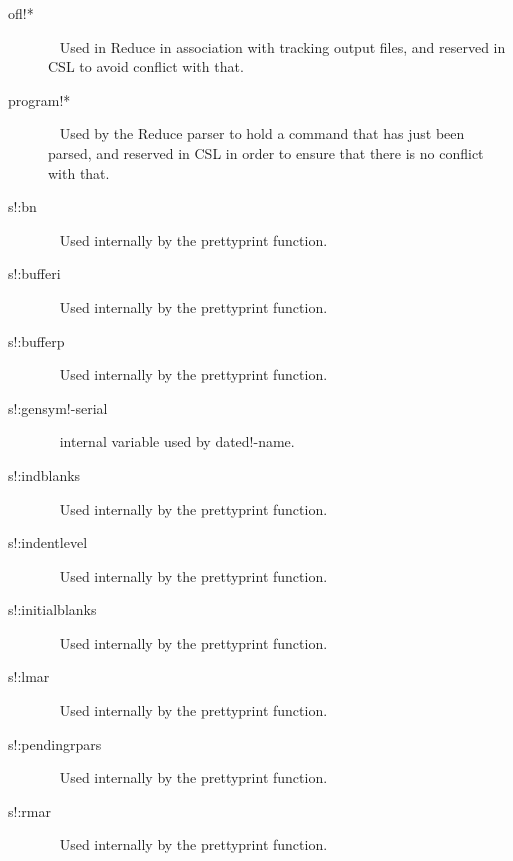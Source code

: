 \documentclass[a4paper,11pt]{article}
\begin{document}
\begin{description}
\item [{\ttfamily ofl!*}]  ~\newline
Used in Reduce in association with tracking output files, and reserved in
CSL to avoid conflict with that.

\item [{\ttfamily program!*}]  ~\newline
Used by the Reduce parser to hold a command that has just been parsed, and
reserved in CSL in order to ensure that there is no conflict with that.

\item [{\ttfamily s!:bn}]  ~\newline
Used internally by the prettyprint function.

\item [{\ttfamily s!:bufferi}] ~\newline
Used internally by the prettyprint function.

\item [{\ttfamily s!:bufferp}] ~\newline
Used internally by the prettyprint function.

\item [{\ttfamily s!:gensym!-serial}]  ~\newline
internal variable used by {\ttfamily dated!-name}.

\item [{\ttfamily s!:indblanks}]  ~\newline
Used internally by the prettyprint function.

\item [{\ttfamily s!:indentlevel}] ~\newline
Used internally by the prettyprint function.

\item [{\ttfamily s!:initialblanks}] ~\newline
Used internally by the prettyprint function.

\item [{\ttfamily s!:lmar}] ~\newline
Used internally by the prettyprint function.

\item [{\ttfamily s!:pendingrpars}] ~\newline
Used internally by the prettyprint function.

\item [{\ttfamily s!:rmar}] ~\newline
Used internally by the prettyprint function.


\end{description}
\end{document}
